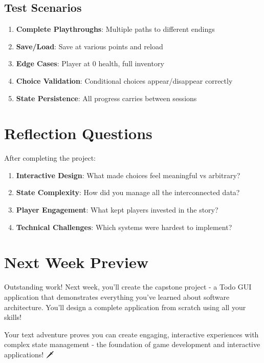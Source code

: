 \documentclass[
  letterpaper,
  DIV=11,
  numbers=noendperiod,
  oneside]{scrreprt}
\providecommand{\tightlist}{%
  \setlength{\itemsep}{0pt}\setlength{\parskip}{0pt}}\usepackage{longtable,booktabs,array}
\begin{document}
\subsection{Test Scenarios}\label{test-scenarios}

\begin{enumerate}
\def\labelenumi{\arabic{enumi}.}
\tightlist
\item
  \textbf{Complete Playthroughs}: Multiple paths to different endings
\item
  \textbf{Save/Load}: Save at various points and reload
\item
  \textbf{Edge Cases}: Player at 0 health, full inventory
\item
  \textbf{Choice Validation}: Conditional choices appear/disappear
  correctly
\item
  \textbf{State Persistence}: All progress carries between sessions
\end{enumerate}

\section{Reflection Questions}\label{reflection-questions-10}

After completing the project:

\begin{enumerate}
\def\labelenumi{\arabic{enumi}.}
\tightlist
\item
  \textbf{Interactive Design}: What made choices feel meaningful vs
  arbitrary?
\item
  \textbf{State Complexity}: How did you manage all the interconnected
  data?
\item
  \textbf{Player Engagement}: What kept players invested in the story?
\item
  \textbf{Technical Challenges}: Which systems were hardest to
  implement?
\end{enumerate}

\section{Next Week Preview}\label{next-week-preview-8}

Outstanding work! Next week, you'll create the capstone project - a Todo
GUI application that demonstrates everything you've learned about
software architecture. You'll design a complete application from scratch
using all your skills!

Your text adventure proves you can create engaging, interactive
experiences with complex state management - the foundation of game
development and interactive applications! 🗡️
\end{document}
